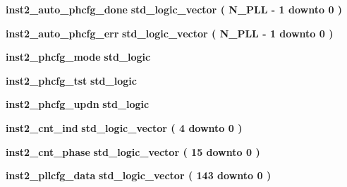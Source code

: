 \begin{DoxyCompactItemize}
\item 
{\bf inst2\+\_\+auto\+\_\+phcfg\+\_\+done} {\bfseries \textcolor{comment}{std\+\_\+logic\+\_\+vector}\textcolor{vhdlchar}{ }\textcolor{vhdlchar}{(}\textcolor{vhdlchar}{ }\textcolor{vhdlchar}{ }\textcolor{vhdlchar}{ }\textcolor{vhdlchar}{ }{\bfseries {\bf N\+\_\+\+P\+LL}} \textcolor{vhdlchar}{-\/}\textcolor{vhdlchar}{ } \textcolor{vhdldigit}{1} \textcolor{vhdlchar}{ }\textcolor{keywordflow}{downto}\textcolor{vhdlchar}{ }\textcolor{vhdlchar}{ } \textcolor{vhdldigit}{0} \textcolor{vhdlchar}{ }\textcolor{vhdlchar}{)}\textcolor{vhdlchar}{ }} 
\item 
{\bf inst2\+\_\+auto\+\_\+phcfg\+\_\+err} {\bfseries \textcolor{comment}{std\+\_\+logic\+\_\+vector}\textcolor{vhdlchar}{ }\textcolor{vhdlchar}{(}\textcolor{vhdlchar}{ }\textcolor{vhdlchar}{ }\textcolor{vhdlchar}{ }\textcolor{vhdlchar}{ }{\bfseries {\bf N\+\_\+\+P\+LL}} \textcolor{vhdlchar}{-\/}\textcolor{vhdlchar}{ } \textcolor{vhdldigit}{1} \textcolor{vhdlchar}{ }\textcolor{keywordflow}{downto}\textcolor{vhdlchar}{ }\textcolor{vhdlchar}{ } \textcolor{vhdldigit}{0} \textcolor{vhdlchar}{ }\textcolor{vhdlchar}{)}\textcolor{vhdlchar}{ }} 
\item 
{\bf inst2\+\_\+phcfg\+\_\+mode} {\bfseries \textcolor{comment}{std\+\_\+logic}\textcolor{vhdlchar}{ }} 
\item 
{\bf inst2\+\_\+phcfg\+\_\+tst} {\bfseries \textcolor{comment}{std\+\_\+logic}\textcolor{vhdlchar}{ }} 
\item 
{\bf inst2\+\_\+phcfg\+\_\+updn} {\bfseries \textcolor{comment}{std\+\_\+logic}\textcolor{vhdlchar}{ }} 
\item 
{\bf inst2\+\_\+cnt\+\_\+ind} {\bfseries \textcolor{comment}{std\+\_\+logic\+\_\+vector}\textcolor{vhdlchar}{ }\textcolor{vhdlchar}{(}\textcolor{vhdlchar}{ }\textcolor{vhdlchar}{ } \textcolor{vhdldigit}{4} \textcolor{vhdlchar}{ }\textcolor{keywordflow}{downto}\textcolor{vhdlchar}{ }\textcolor{vhdlchar}{ } \textcolor{vhdldigit}{0} \textcolor{vhdlchar}{ }\textcolor{vhdlchar}{)}\textcolor{vhdlchar}{ }} 
\item 
{\bf inst2\+\_\+cnt\+\_\+phase} {\bfseries \textcolor{comment}{std\+\_\+logic\+\_\+vector}\textcolor{vhdlchar}{ }\textcolor{vhdlchar}{(}\textcolor{vhdlchar}{ }\textcolor{vhdlchar}{ } \textcolor{vhdldigit}{15} \textcolor{vhdlchar}{ }\textcolor{keywordflow}{downto}\textcolor{vhdlchar}{ }\textcolor{vhdlchar}{ } \textcolor{vhdldigit}{0} \textcolor{vhdlchar}{ }\textcolor{vhdlchar}{)}\textcolor{vhdlchar}{ }} 
\item 
{\bf inst2\+\_\+pllcfg\+\_\+data} {\bfseries \textcolor{comment}{std\+\_\+logic\+\_\+vector}\textcolor{vhdlchar}{ }\textcolor{vhdlchar}{(}\textcolor{vhdlchar}{ }\textcolor{vhdlchar}{ } \textcolor{vhdldigit}{143} \textcolor{vhdlchar}{ }\textcolor{keywordflow}{downto}\textcolor{vhdlchar}{ }\textcolor{vhdlchar}{ } \textcolor{vhdldigit}{0} \textcolor{vhdlchar}{ }\textcolor{vhdlchar}{)}\textcolor{vhdlchar}{ }} 

\end{DoxyCompactItemize}
